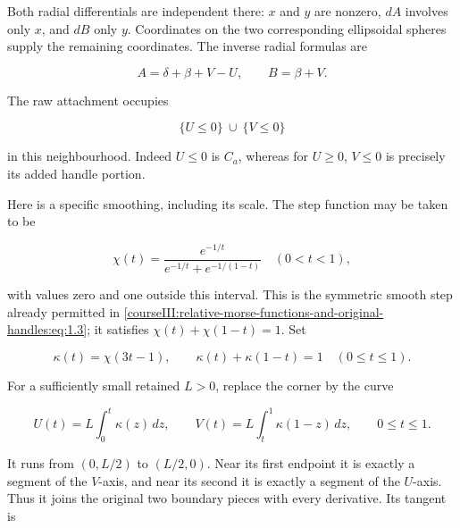 Both radial differentials are independent there: \(x\) and \(y\) are nonzero, \(dA\) involves only \(x\), and \(dB\) only \(y\). Coordinates on the two corresponding ellipsoidal spheres supply the remaining coordinates. The inverse radial formulas are

\begin{equation}
A=\delta+\beta+V-U,\qquad B=\beta+V.
\label{courseIII:relative-morse-functions-and-original-handles:eq:4.13}
\end{equation}

The raw attachment occupies

\begin{equation}
\{U\leq0\}\ \cup\ \{V\leq0\}
\label{courseIII:relative-morse-functions-and-original-handles:eq:4.14}
\end{equation}

in this neighbourhood. Indeed \(U\leq0\) is \(C_a\), whereas for \(U\geq0\), \(V\leq0\) is precisely its added handle portion.

Here is a specific smoothing, including its scale. The step function may be taken to be

\begin{equation}
\chi(t)=\frac{e^{-1/t}}{e^{-1/t}+e^{-1/(1-t)}}\quad(0<t<1),
\label{courseIII:relative-morse-functions-and-original-handles:eq:4.15}
\end{equation}

with values zero and one outside this interval. This is the symmetric smooth step already permitted in \eqref{courseIII:relative-morse-functions-and-original-handles:eq:1.3}; it satisfies \(\chi(t)+\chi(1-t)=1\). Set

\begin{equation}
\kappa(t)=\chi(3t-1),\qquad
\kappa(t)+\kappa(1-t)=1\quad(0\leq t\leq1).
\label{courseIII:relative-morse-functions-and-original-handles:eq:4.16}
\end{equation}

For a sufficiently small retained \(L>0\), replace the corner by the curve

\begin{equation}
U(t)=L\int_0^t\kappa(z)\,dz,\qquad
V(t)=L\int_t^1\kappa(1-z)\,dz,\qquad 0\leq t\leq1.
\label{courseIII:relative-morse-functions-and-original-handles:eq:4.17}
\end{equation}

It runs from \((0,L/2)\) to \((L/2,0)\). Near its first endpoint it is exactly a segment of the \(V\)-axis, and near its second it is exactly a segment of the \(U\)-axis. Thus it joins the original two boundary pieces with every derivative. Its tangent is

